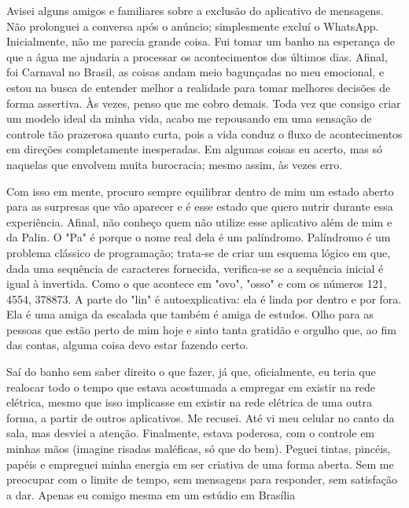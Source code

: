 Avisei alguns amigos e familiares sobre a exclusão do aplicativo de mensagens. Não prolonguei a conversa após o anúncio; simplesmente excluí o WhatsApp. Inicialmente, não me parecia grande coisa. Fui tomar um banho na esperança de que a água me ajudaria a processar os acontecimentos dos últimos dias. Afinal, foi Carnaval no Brasil, as coisas andam meio bagunçadas no meu emocional, e estou na busca de entender melhor a realidade para tomar melhores decisões de forma assertiva. Às vezes, penso que me cobro demais. Toda vez que consigo criar um modelo ideal da minha vida, acabo me repousando em uma sensação de controle tão prazerosa quanto curta, pois a vida conduz o fluxo de acontecimentos em direções completamente inesperadas. Em algumas coisas eu acerto, mas só naquelas que envolvem muita burocracia; mesmo assim, às vezes erro.

Com isso em mente, procuro sempre equilibrar dentro de mim um estado aberto para as surpresas que vão aparecer e é esse estado que quero nutrir durante essa experiência. Afinal, não conheço quem não utilize esse aplicativo além de mim e da Palin. O "Pa" é porque o nome real dela é um palíndromo. Palíndromo é um problema clássico de programação; trata-se de criar um esquema lógico em que, dada uma sequência de caracteres fornecida, verifica-se se a sequência inicial é igual à invertida. Como o que acontece em "ovo", "osso" e com os números 121, 4554, 378873. A parte do "lin" é autoexplicativa: ela é linda por dentro e por fora. Ela é uma amiga da escalada que também é amiga de estudos. Olho para as pessoas que estão perto de mim hoje e sinto tanta gratidão e orgulho que, ao fim das contas, alguma coisa devo estar fazendo certo.

Saí do banho sem saber direito o que fazer, já que, oficialmente, eu teria que realocar todo o tempo que estava acostumada a empregar em existir na rede elétrica, mesmo que isso implicasse em existir na rede elétrica de uma outra forma, a partir de outros aplicativos. Me recusei. Até vi meu celular no canto da sala, mas desviei a atenção. Finalmente, estava poderosa, com o controle em minhas mãos (imagine risadas maléficas, só que do bem). Peguei tintas, pincéis, papéis e empreguei minha energia em ser criativa de uma forma aberta. Sem me preocupar com o limite de tempo, sem mensagens para responder, sem satisfação a dar. Apenas eu comigo mesma em um estúdio em Brasília

